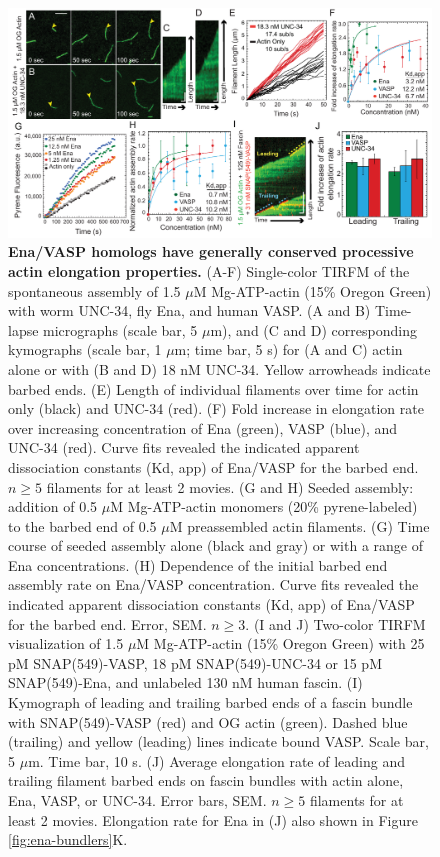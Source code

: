 \begin{figure}
\centering
\includegraphics[width=\textwidth]{img/ch02/Supp_Figure_1.pdf}
\caption[Ena/VASP homologs have generally conserved processive actin elongation properties.]{\textbf{Ena/VASP homologs have generally conserved processive actin elongation properties.} (A-F) Single-color TIRFM of the spontaneous assembly of 1.5 $\mu$M Mg-ATP-actin (15\% Oregon Green) with worm UNC-34, fly Ena, and human VASP. (A and B) Time-lapse micrographs (scale bar, 5 $\mu$m), and (C and D) corresponding kymographs (scale bar, 1 $\mu$m; time bar, 5 s) for (A and C) actin alone or with (B and D) 18 nM UNC-34. Yellow arrowheads indicate barbed ends. (E) Length of individual filaments over time for actin only (black) and UNC-34 (red). (F) Fold increase in elongation rate over increasing concentration of Ena (green), VASP (blue), and UNC-34 (red). Curve fits revealed the indicated apparent dissociation constants (Kd, app) of Ena/VASP for the barbed end. $n \geq 5$ filaments for at least 2 movies. (G and H) Seeded assembly: addition of 0.5 $\mu$M Mg-ATP-actin monomers (20\% pyrene-labeled) to the barbed end of 0.5 $\mu$M preassembled actin filaments. (G) Time course of seeded assembly alone (black and gray) or with a range of Ena concentrations. (H) Dependence of the initial barbed end assembly rate on Ena/VASP concentration. Curve fits revealed the indicated apparent dissociation constants (Kd, app) of Ena/VASP for the barbed end. Error, SEM. $n \geq 3$. (I and J) Two-color TIRFM visualization of 1.5 $\mu$M Mg-ATP-actin (15\% Oregon Green) with 25 pM SNAP(549)-VASP, 18 pM SNAP(549)-UNC-34 or 15 pM SNAP(549)-Ena, and unlabeled 130 nM human fascin. (I) Kymograph of leading and trailing barbed ends of a fascin bundle with SNAP(549)-VASP (red) and OG actin (green). Dashed blue (trailing) and yellow (leading) lines indicate bound VASP. Scale bar, 5 $\mu$m. Time bar, 10 s. (J) Average elongation rate of leading and trailing filament barbed ends on fascin bundles with actin alone, Ena, VASP, or UNC-34. Error bars, SEM. $n \geq 5$ filaments for at least 2 movies. Elongation rate for Ena in (J) also shown in Figure \ref{fig:ena-bundlers}K.}
\label{fig:ena-homologs}
\end{figure}

